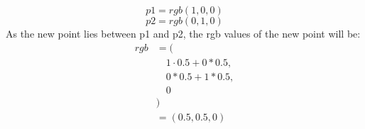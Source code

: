 \documentclass{article}
\begin{document}
\[
    p1 = rgb(1, 0, 0)
\]
\[
    p2 = rgb(0, 1, 0)
\]
As the new point lies between p1 and p2, the rgb values of the new point will be:
\begin{align*}
    rgb & = (                          \\
        & \quad 1 \cdot 0.5 + 0 * 0.5, \\
        & \quad 0 * 0.5 + 1 * 0.5,     \\
        & \quad 0                      \\
        & )                            \\
        & = (0.5, 0.5, 0)
\end{align*}
\end{document}
